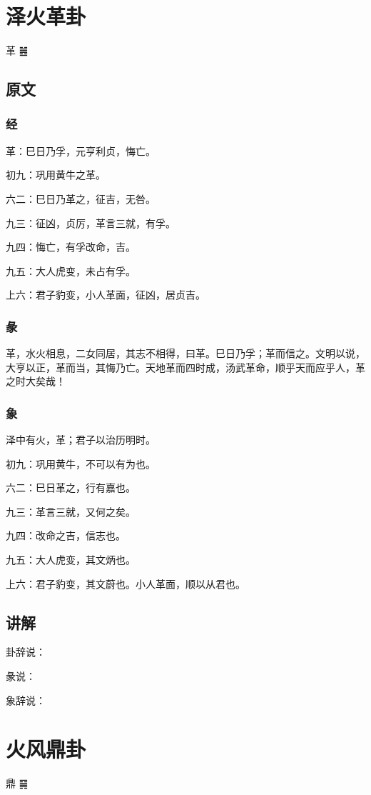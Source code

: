 \documentclass[12pt,oneside]{book}
\begin{document}
\chapter{泽火革卦}
革 {\Large ䷰}

\section{原文}

\subsection{经}
革：巳日乃孚，元亨利贞，悔亡。

初九：巩用黄牛之革。

六二：巳日乃革之，征吉，无咎。

九三：征凶，贞厉，革言三就，有孚。

九四：悔亡，有孚改命，吉。

九五：大人虎变，未占有孚。

上六：君子豹变，小人革面，征凶，居贞吉。

\subsection{彖}
革，水火相息，二女同居，其志不相得，曰革。巳日乃孚；革而信之。文明以说，大亨以正，革而当，其悔乃亡。天地革而四时成，汤武革命，顺乎天而应乎人，革之时大矣哉！

\subsection{象}
泽中有火，革；君子以治历明时。

初九：巩用黄牛，不可以有为也。

六二：巳日革之，行有嘉也。

九三：革言三就，又何之矣。

九四：改命之吉，信志也。

九五：大人虎变，其文炳也。

上六：君子豹变，其文蔚也。小人革面，顺以从君也。

\section{讲解}
卦辞说：

彖说：

象辞说：

\chapter{火风鼎卦}
鼎 {\large ䷱}
\end{document}

